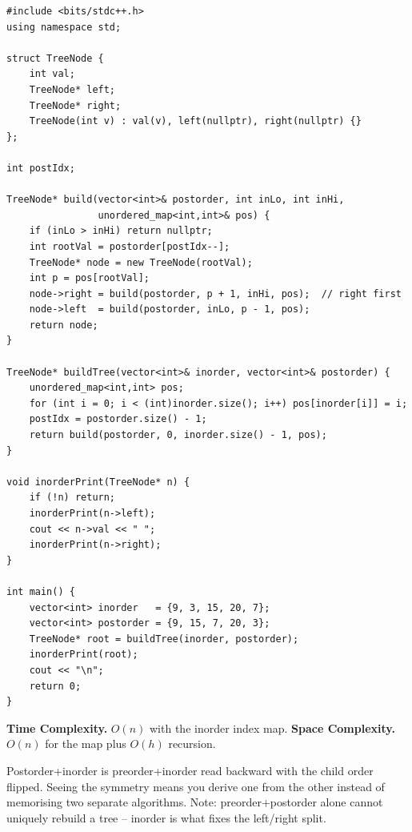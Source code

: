 \begin{lstlisting}
#include <bits/stdc++.h>
using namespace std;

struct TreeNode {
    int val;
    TreeNode* left;
    TreeNode* right;
    TreeNode(int v) : val(v), left(nullptr), right(nullptr) {}
};

int postIdx;

TreeNode* build(vector<int>& postorder, int inLo, int inHi,
                unordered_map<int,int>& pos) {
    if (inLo > inHi) return nullptr;
    int rootVal = postorder[postIdx--];
    TreeNode* node = new TreeNode(rootVal);
    int p = pos[rootVal];
    node->right = build(postorder, p + 1, inHi, pos);  // right first
    node->left  = build(postorder, inLo, p - 1, pos);
    return node;
}

TreeNode* buildTree(vector<int>& inorder, vector<int>& postorder) {
    unordered_map<int,int> pos;
    for (int i = 0; i < (int)inorder.size(); i++) pos[inorder[i]] = i;
    postIdx = postorder.size() - 1;
    return build(postorder, 0, inorder.size() - 1, pos);
}

void inorderPrint(TreeNode* n) {
    if (!n) return;
    inorderPrint(n->left);
    cout << n->val << " ";
    inorderPrint(n->right);
}

int main() {
    vector<int> inorder   = {9, 3, 15, 20, 7};
    vector<int> postorder = {9, 15, 7, 20, 3};
    TreeNode* root = buildTree(inorder, postorder);
    inorderPrint(root);
    cout << "\n";
    return 0;
}
\end{lstlisting}

\begin{complexitybox}
\textbf{Time Complexity.} $O(n)$ with the inorder index map. \textbf{Space
Complexity.} $O(n)$ for the map plus $O(h)$ recursion.
\end{complexitybox}

\begin{takeawaybox}
Postorder+inorder is preorder+inorder read backward with the child order
flipped. Seeing the symmetry means you derive one from the other instead of
memorising two separate algorithms. Note: preorder+postorder alone cannot
uniquely rebuild a tree -- inorder is what fixes the left/right split.
\end{takeawaybox}
